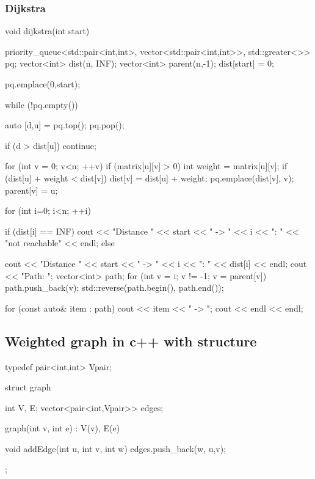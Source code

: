 \documentclass{report}
\begin{document}
\subsubsection{Dijkstra}
\bigbreak \noindent 
\begin{cppcode}
    void dijkstra(int start) {
        priority_queue<std::pair<int,int>, vector<std::pair<int,int>>, std::greater<>> pq;
        vector<int> dist(n, INF);
        vector<int> parent(n,-1);
        dist[start] = 0;

        pq.emplace(0,start);

        while (!pq.empty()) {
            auto [d,u] = pq.top();
            pq.pop();

            if (d > dist[u]) continue;

            for (int v = 0; v<n; ++v) {
                if (matrix[u][v] > 0) {
                    int weight = matrix[u][v];
                    if (dist[u] + weight < dist[v]) {
                        dist[v] = dist[u] + weight;
                        pq.emplace(dist[v], v);
                        parent[v] = u;
                    }
                }
            }
        }
        for (int i=0; i<n; ++i) {
            if (dist[i] == INF) {
                cout << "Distance " << start << " -> " << i << ": " << "not reachable" << endl;
            } else {
                cout << "Distance " << start << " -> " << i << ": " << dist[i] << endl;
                cout << "Path: ";
                vector<int> path;
                for (int v = i; v != -1; v = parent[v]) {
                    path.push_back(v);
                }
                std::reverse(path.begin(), path.end());

                for (const auto& item : path) {
                    cout << item << " -> ";
                }
                cout << endl << endl;
            }
        }
    }
\end{cppcode}

\pagebreak 
\subsection{Weighted graph in c++ with structure}
\bigbreak \noindent 
\begin{cppcode}
typedef pair<int,int> Vpair;

struct graph {
    int V, E;
    vector<pair<int,Vpair>> edges;

    graph(int v, int e) : V(v), E(e) {}

    void addEdge(int u, int v, int w) {
        edges.push_back({w, {u,v}});
    }
};
\end{cppcode}
\end{document}
